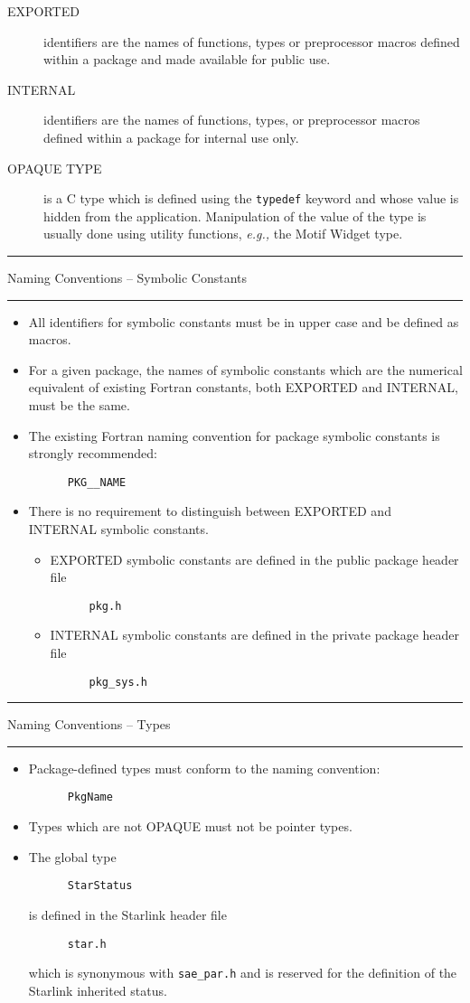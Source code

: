 \documentclass[twoside,11pt]{article}
\newcounter{sruleno}
\newcommand{\srule}[1]{
    \addtocounter{sruleno}{1}
    \goodbreak
    \rule[0.5ex]{\textwidth}{0.3mm}
    {\Large #1 \hfill {\thesruleno}}
    \rule[0.5ex]{\textwidth}{0.1mm}
}
\newcommand{\srule}[1]{
       \addtocounter{sruleno}{1}
       \begin{rawhtml} <HR> \end{rawhtml}
       {\Large \thesruleno}~~~~{\Large #1}
       \begin{rawhtml} <HR> \end{rawhtml}
       \end{tabular}
  }
\begin{document}
\begin{description}
\item [EXPORTED] identifiers are the names of functions, types or preprocessor 
macros defined within a package and made available for public use.
\item [INTERNAL] identifiers are the names of functions, types, or 
preprocessor macros defined within a package for internal use only.
\item [OPAQUE TYPE] is a C type which is defined using the \verb~typedef~ 
keyword and whose 
value is hidden from the application.  Manipulation of the value of the type 
is usually done using utility functions, {\em e.g.,} the Motif Widget type.
\end{description}


\srule{Naming Conventions -- Symbolic Constants}
\begin{itemize}
\item All identifiers for symbolic constants must be in upper case and be 
defined as macros.
\item For a given package, the names of symbolic constants which are the 
numerical equivalent of existing Fortran constants, both EXPORTED and 
INTERNAL, must be the same.
\item The existing Fortran naming convention for package symbolic constants 
is strongly recommended:
\begin{verbatim}
      PKG__NAME
\end{verbatim}
\item There is no requirement to distinguish between EXPORTED and INTERNAL 
symbolic constants.
\begin{itemize}
\item EXPORTED symbolic constants are defined in the public package header 
file
\begin{verbatim}
      pkg.h
\end{verbatim}
\item INTERNAL symbolic constants are defined in the private package header 
file
\begin{verbatim}
      pkg_sys.h
\end{verbatim}
\end{itemize}
\end{itemize}

\srule{Naming Conventions -- Types}
\begin{itemize}
\item Package-defined types must conform to the naming convention:
\begin{verbatim}
      PkgName
\end{verbatim}
\item Types which are not OPAQUE must not be pointer types.
\item The global type
\begin{verbatim}
      StarStatus
\end{verbatim}
is defined in the Starlink header file
\begin{verbatim}
      star.h
\end{verbatim}
which is synonymous with {\tt sae\_par.h} and is reserved for the definition 
of the Starlink inherited status.
\end{itemize}
\end{document}
